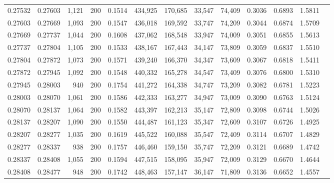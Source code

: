 \begin{tabular}{rrrrrrrrrrrrr}
0.27532 & 0.27603 &  1,121 & 200 &                                     0.1514 & 434,925 & 170,685 &  33,547 &  74,409 & 0.3036 & 0.6893 & 1.5811 \\
0.27603 & 0.27669 &  1,093 & 200 &                                     0.1547 & 436,018 & 169,592 &  33,747 &  74,209 & 0.3044 & 0.6874 & 1.5709 \\
0.27669 & 0.27737 &  1,044 & 200 &                                     0.1608 & 437,062 & 168,548 &  33,947 &  74,009 & 0.3051 & 0.6855 & 1.5613 \\
0.27737 & 0.27804 &  1,105 & 200 &                                     0.1533 & 438,167 & 167,443 &  34,147 &  73,809 & 0.3059 & 0.6837 & 1.5510 \\
0.27804 & 0.27872 &  1,073 & 200 &                                     0.1571 & 439,240 & 166,370 &  34,347 &  73,609 & 0.3067 & 0.6818 & 1.5411 \\
0.27872 & 0.27945 &  1,092 & 200 &                                     0.1548 & 440,332 & 165,278 &  34,547 &  73,409 & 0.3076 & 0.6800 & 1.5310 \\
0.27945 & 0.28003 &    940 & 200 &                                     0.1754 & 441,272 & 164,338 &  34,747 &  73,209 & 0.3082 & 0.6781 & 1.5223 \\
0.28003 & 0.28070 &  1,061 & 200 &                                     0.1586 & 442,333 & 163,277 &  34,947 &  73,009 & 0.3090 & 0.6763 & 1.5124 \\
0.28070 & 0.28137 &  1,064 & 200 &                                     0.1582 & 443,397 & 162,213 &  35,147 &  72,809 & 0.3098 & 0.6744 & 1.5026 \\
0.28137 & 0.28207 &  1,090 & 200 &                                     0.1550 & 444,487 & 161,123 &  35,347 &  72,609 & 0.3107 & 0.6726 & 1.4925 \\
0.28207 & 0.28277 &  1,035 & 200 &                                     0.1619 & 445,522 & 160,088 &  35,547 &  72,409 & 0.3114 & 0.6707 & 1.4829 \\
0.28277 & 0.28337 &    938 & 200 &                                     0.1757 & 446,460 & 159,150 &  35,747 &  72,209 & 0.3121 & 0.6689 & 1.4742 \\
0.28337 & 0.28408 &  1,055 & 200 &                                     0.1594 & 447,515 & 158,095 &  35,947 &  72,009 & 0.3129 & 0.6670 & 1.4644 \\
0.28408 & 0.28477 &    948 & 200 &                                     0.1742 & 448,463 & 157,147 &  36,147 &  71,809 & 0.3136 & 0.6652 & 1.4557 \\

\end{tabular}
